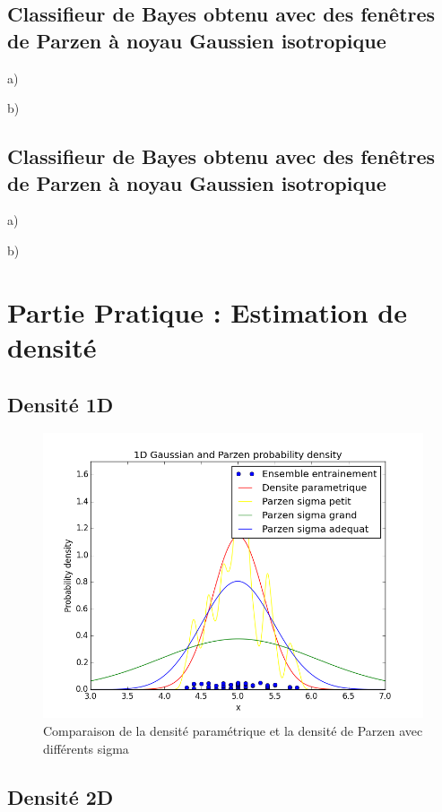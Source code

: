 \documentclass[a4paper,10pt]{article}
\begin{document}
\subsection{Classifieur de Bayes obtenu avec des fenêtres de Parzen à noyau Gaussien isotropique}

a)

b)


\subsection{Classifieur de Bayes obtenu avec des fenêtres de Parzen à noyau Gaussien isotropique}

a)

b)

\section{Partie Pratique : Estimation de densité}

\subsection{Densité 1D}

\begin{figure}[H]
	\includegraphics[width=12cm]{images/1D_Gaussian_and_Parzen_probability_density} 
	\centering
	\caption{Comparaison de la densité paramétrique et la densité de Parzen avec différents sigma}
	\label{fig:comp}
\end{figure}

\subsection{Densité 2D}
\end{document}
